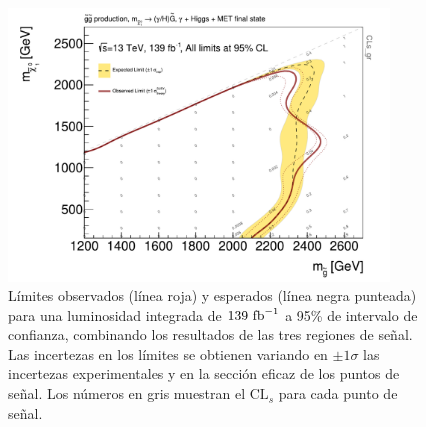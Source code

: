 \begin{figure}[ht!]
  \centering


  \includegraphics[width=0.9\textwidth]{images/results/limits_plots/contour_plot_gHBestSR_wMatplotLib_full.pdf}

  \caption{Límites observados (línea roja) y esperados (línea negra punteada) para una luminosidad integrada de $139\ \text{fb}^{-1}$ a 95\% de intervalo de confianza, combinando los resultados de las tres regiones de señal. Las incertezas en los límites se obtienen variando en $\pm1\sigma$ las incertezas experimentales y en la sección eficaz de los puntos de señal. Los números en gris muestran el $\text{CL}_{s}$ para cada punto de señal.}
  \label{fig:limit_plot_combined}

\end{figure}
